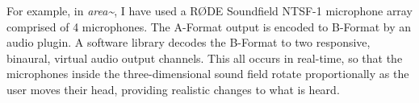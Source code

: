 For example, in \textit{area\textasciitilde{}}, I have used a RØDE Soundfield NTSF-1 microphone array comprised of 4 microphones. The A-Format output is encoded to B-Format by an audio plugin. A software library decodes the B-Format to two responsive, binaural, virtual audio output channels. This all occurs in real-time, so that the microphones inside the three-dimensional sound field rotate proportionally as the user moves their head, providing realistic changes to what is heard.


%
